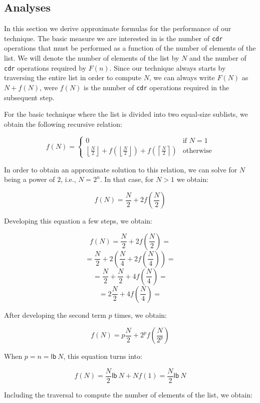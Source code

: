 \subsection{Analyses}
\label{sec-analyses}

In this section we derive approximate formulas for the performance of
our technique.  The basic measure we are interested in is the number
of \texttt{cdr} operations that must be performed as a function of the
number of elements of the list.  We will denote the number of elements
of the list by $N$ and the number of \texttt{cdr} operations required
by $F(n)$.  Since our technique always starts by traversing the entire
list in order to compute $N$, we can always write $F(N)$ as $N +
f(N)$, were $f(N)$ is the number of \texttt{cdr} operations required
in the subsequent step.

For the basic technique where the list is divided into two equal-size
sublists, we obtain the following recursive relation:

\[ f(N) = \left\{ \begin{array}{ll}
                    0 & \mbox{if $N = 1$} \\
                    \left\lfloor\frac{N}{2}\right\rfloor
                    + f(\left\lfloor\frac{N}{2}\right\rfloor)
                    + f(\left\lceil\frac{N}{2}\right\rceil) &
                    \mbox{otherwise}
                  \end{array} \right. \]

In order to obtain an approximate solution to this relation, we can
solve for $N$ being a power of $2$, i.e., $N = 2^n$.  In that case,
for $N>1$ we obtain:

\[ f(N) = \frac{N}{2} + 2f(\frac{N}{2}) \]

Developing this equation a few steps, we obtain:

\[ f(N) = \frac{N}{2} + 2f(\frac{N}{2}) = \]
\[ = \frac{N}{2} + 2(\frac{N}{4} + 2f(\frac{N}{4})) =\]
\[ = \frac{N}{2} + \frac{N}{2} + 4f(\frac{N}{4}) =\]
\[ = 2\frac{N}{2} + 4f(\frac{N}{4}) = \]

After developing the second term $p$ times, we obtain:

\[ f(N) = p\frac{N}{2} + 2^pf(\frac{N}{2^p})\]

When $p = n = \mathsf{lb}~N$, this equation turns into:

\[ f(N) = \frac{N}{2}\mathsf{lb}~N + Nf(1) = \frac{N}{2}\mathsf{lb}~N\]

Including the traversal to compute the number of elements of the list,
we obtain:

